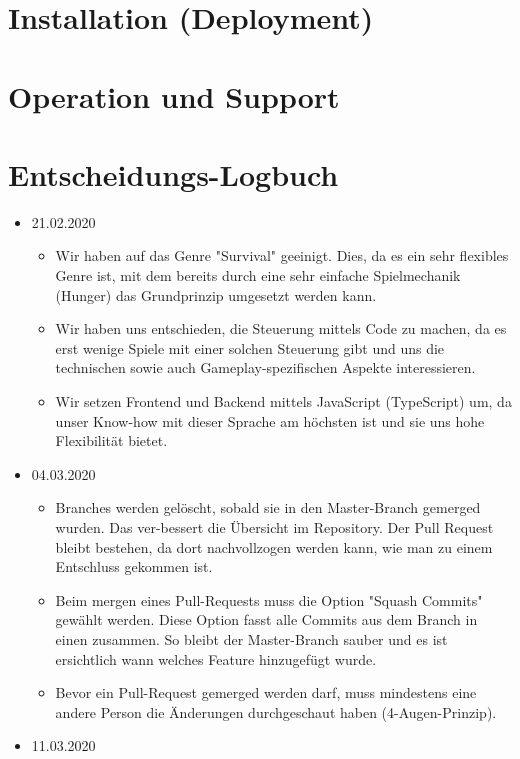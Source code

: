 \documentclass[a4paper, 11pt]{scrartcl}
\let\oldsection\section
\renewcommand\section{\clearpage\oldsection}
\begin{document}
\section{Installation (Deployment)}

\section{Operation und Support}

\section{Entscheidungs-Logbuch}

\begin{itemize}
\item 21.02.2020
\begin{itemize}
\item Wir haben auf das Genre "Survival" geeinigt. Dies, da es ein sehr flexibles Genre ist, mit dem bereits durch eine sehr einfache Spielmechanik (Hunger) das Grundprinzip umgesetzt werden kann.
\item Wir haben uns entschieden, die Steuerung mittels Code zu machen, da es erst wenige Spiele mit einer solchen Steuerung gibt und uns die technischen sowie auch Gameplay-spezifischen Aspekte interessieren.
\item Wir setzen Frontend und Backend mittels JavaScript (TypeScript) um, da unser Know-how mit dieser Sprache am höchsten ist und sie uns hohe Flexibilität bietet.
\end{itemize}
\item 04.03.2020
\begin{itemize}
\item Branches werden gelöscht, sobald sie in den Master-Branch gemerged wurden. Das ver-bessert die Übersicht im Repository. Der Pull Request bleibt bestehen, da dort nachvollzogen werden kann, wie man zu einem Entschluss gekommen ist. 
\item Beim mergen eines Pull-Requests muss die Option "Squash Commits" gewählt werden. Diese Option fasst alle Commits aus dem Branch in einen zusammen. So bleibt der Master-Branch sauber und es ist ersichtlich wann welches Feature hinzugefügt wurde. 
\item Bevor ein Pull-Request gemerged werden darf, muss mindestens eine andere Person die Änderungen durchgeschaut haben (4-Augen-Prinzip).
\end{itemize}
\item 11.03.2020
\begin{itemize}

\end{itemize}
\end{itemize}
\end{document}
